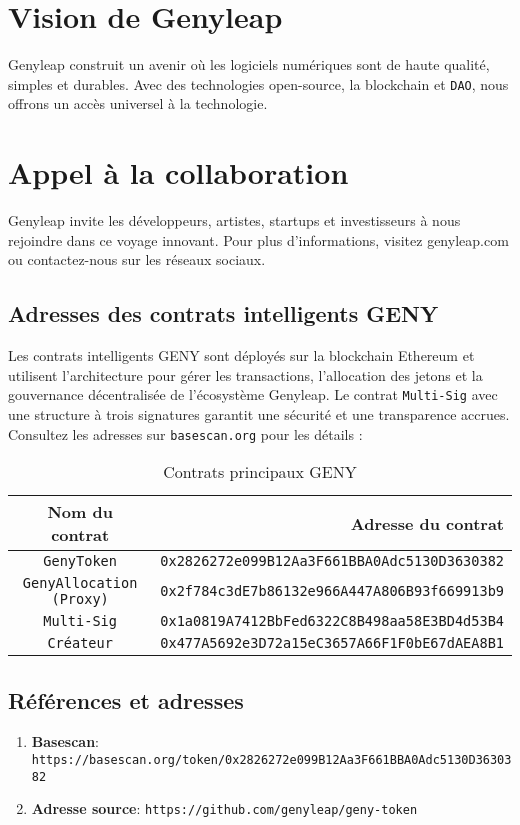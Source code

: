 \documentclass[a4paper,12pt,openany]{book}
\begin{document}
\chapter{Vision de Genyleap}
Genyleap construit un avenir où les logiciels numériques sont de haute qualité, simples et durables. Avec des technologies open-source, la blockchain et \texttt{DAO}, nous offrons un accès universel à la technologie.

\chapter{Appel à la collaboration}
Genyleap invite les développeurs, artistes, startups et investisseurs à nous rejoindre dans ce voyage innovant. Pour plus d'informations, visitez genyleap.com ou contactez-nous sur les réseaux sociaux.

\section*{Adresses des contrats intelligents GENY}
Les contrats intelligents GENY sont déployés sur la blockchain Ethereum et utilisent l'architecture  pour gérer les transactions, l'allocation des jetons et la gouvernance décentralisée de l'écosystème Genyleap. Le contrat \texttt{Multi-Sig} avec une structure à trois signatures garantit une sécurité et une transparence accrues. Consultez les adresses sur \texttt{basescan.org} pour les détails :

\begin{table}[h]
\centering
\caption*{Contrats principaux GENY}
\small
\begin{tabular}{c r}
\hline
\textbf{Nom du contrat} & \textbf{Adresse du contrat} \\
\hline
\texttt{GenyToken} & {\texttt{0x2826272e099B12Aa3F661BBA0Adc5130D3630382}} \\
\texttt{GenyAllocation (Proxy)} & {\texttt{0x2f784c3dE7b86132e966A447A806B93f669913b9}} \\
\texttt{Multi-Sig} & {\texttt{0x1a0819A7412BbFed6322C8B498aa58E3BD4d53B4}} \\
\texttt{Créateur} & {\texttt{0x477A5692e3D72a15eC3657A66F1F0bE67dAEA8B1}} \\
\hline
\end{tabular}
\end{table}

\section*{Références et adresses}

\begin{enumerate}
    \item \textbf{Basescan}: \texttt{https://basescan.org/token/0x2826272e099B12Aa3F661BBA0Adc5130D3630382}
    \item \textbf{Adresse source}: \texttt{https://github.com/genyleap/geny-token}
\end{enumerate}
\end{document}
